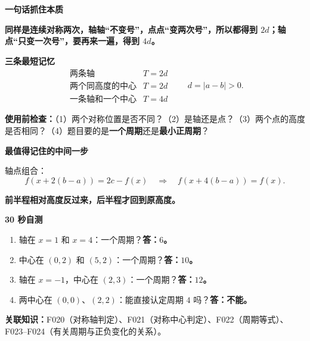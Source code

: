 \clearpage
\begin{summarybox}
\textbf{\textcolor{CSummary}{一句话抓住本质}}

\textbf{同样是连续对称两次，轴轴“不变号”，点点“变两次号”，所以都得到 $2d$；轴点“只变一次号”，要再来一遍，得到 $4d$。}

\medskip
\textbf{\textcolor{CSummary}{三条最短记忆}}
\[
\boxed{\begin{array}{c|c}
\text{两条轴} & T=2d\\[3pt]
\text{两个同高度的中心} & T=2d\\[3pt]
\text{一条轴和一个中心} & T=4d
\end{array}\qquad d=|a-b|>0.}
\]

\textbf{使用前检查：}（1）两个对称位置是否不同？（2）是轴还是点？（3）两个点的高度是否相同？（4）题目要的是\textbf{一个周期}还是\textbf{最小正周期}？

\medskip
\textbf{\textcolor{CSummary}{最值得记住的中间一步}}

轴点组合：
\[
\boxed{f(x+2(b-a))=2c-f(x)}
\quad\Longrightarrow\quad
\boxed{f(x+4(b-a))=f(x)}.
\]

\textbf{前半程相对高度反过来，后半程才回到原高度。}

\medskip
\textbf{\textcolor{CSummary}{30 秒自测}}
\begin{enumerate}[label=\arabic*.,leftmargin=*,itemsep=0.25em]
\item 轴在 $x=1$ 和 $x=4$：一个周期？\quad\textbf{答：$6$。}
\item 中心在 $(0,2)$ 和 $(5,2)$：一个周期？\quad\textbf{答：$10$。}
\item 轴在 $x=-1$，中心在 $(2,3)$：一个周期？\quad\textbf{答：$12$。}
\item 两中心在 $(0,0)$、$(2,2)$：能直接认定周期 $4$ 吗？\quad\textbf{答：不能。}
\end{enumerate}

\textbf{关联知识：}F020（对称轴判定）、F021（对称中心判定）、F022（周期等式）、F023--F024（有关周期与正负变化的关系）。
\end{summarybox}
